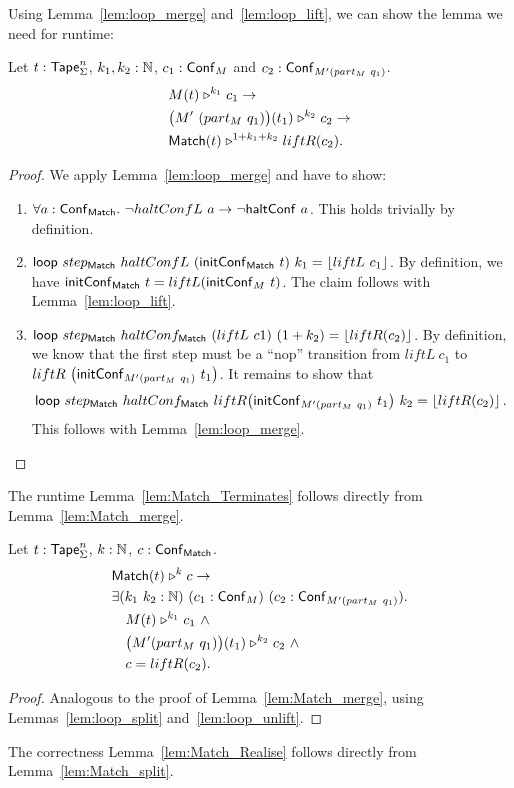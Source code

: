 Using Lemma~\ref{lem:loop_merge} and~\ref{lem:loop_lift}, we can show the lemma we need for runtime:
\begin{lemma}
  \label{lem:Match_merge}
  Let $t : \mathsf{Tape}_\Sigma^n$, $k_1, k_2:\mathbb{N}$, $c_1 : \mathsf{Conf}_M$ and $c_2 : \mathsf{Conf}_{M'(part_M~q_1)}$.
  \begin{alignat*}{1}
    & M(t) \mathrel{\triangleright}^{k_1} c_1 \rightarrow\\
    & \bigl( M'~(part_M~q_1) \bigr) (t_1) \mathrel{\triangleright}^{k_2} c_2 \rightarrow\\
    & \mathsf{Match}(t) \mathrel{\triangleright}^{1+k_1+k_2} liftR(c_2).
  \end{alignat*}
\end{lemma}
\begin{proof}
  We apply Lemma~\ref{lem:loop_merge} and have to show:
  \begin{enumerate}
  \item $\forall a:\mathsf{Conf}_{\mathsf{Match}}.~ \lnot haltConfL~a \rightarrow \lnot \mathsf{haltConf}~a$.  This holds trivially by definition.
  \item $\mathsf{loop}~step_{\mathsf{Match}}~haltConfL~(\mathsf{initConf}_{\mathsf{Match}}~t)~k_1 =
    \left\lfloor {liftL~c_1} \right\rfloor$.  By definition, we have $\mathsf{initConf}_{\mathsf{Match}}~t=liftL(\mathsf{initConf}_M~t)$.  The claim follows with Lemma~\ref{lem:loop_lift}.
  \item $\mathsf{loop}~step_{\mathsf{Match}}~haltConf_{\mathsf{Match}}~(liftL~c1)~(1+k_2) =
    \left\lfloor {liftR(c_2)} \right\rfloor$.  By definition, we know that the first step must be a ``nop'' transition from
    $liftL~c_1$ to\\
    $liftR~\bigl(\mathsf{initConf}_{M'(part_M~q_1)}~t_1 \bigr)$.  It remains to show that
    $$\mathsf{loop}~step_{\mathsf{Match}}~haltConf_{\mathsf{Match}}~liftR \bigl(\mathsf{initConf}_{M'(part_M~q_1)}~t_1 \bigr)~k_2 = \left\lfloor {liftR(c_2)} \right\rfloor.$$
    This follows with Lemma~\ref{lem:loop_merge}.
  \end{enumerate}
\end{proof}
The runtime Lemma~\ref{lem:Match_Terminates} follows directly from Lemma~\ref{lem:Match_merge}.

\begin{lemma}
  \label{lem:Match_split}
  Let $t : \mathsf{Tape}_\Sigma^n$, $k : \mathbb{N}$, $c : \mathsf{Conf}_{\mathsf{Match}}$.
  \begin{align*}
    & \mathsf{Match}(t) \mathrel{\triangleright}^k c \rightarrow \\
    & \exists (k_1~k_2 : \mathbb{N})~(c_1 : \mathsf{Conf}_M)~(c_2 : \mathsf{Conf}_{M'(part_M~q_1)}). \\
    & \quad M(t) \mathrel{\triangleright}^{k_1} c_1 ~\land~ \\
    & \quad \bigl( M' (part_M~q_1) \bigr) (t_1) \mathrel{\triangleright}^{k_2} c_2 ~\land~ \\
    & \quad c = liftR(c_2).
  \end{align*}
\end{lemma}
\begin{proof}
  Analogous to the proof of Lemma~\ref{lem:Match_merge}, using Lemmas~\ref{lem:loop_split} and~\ref{lem:loop_unlift}.
\end{proof}
The correctness Lemma~\ref{lem:Match_Realise} follows directly from Lemma~\ref{lem:Match_split}.


